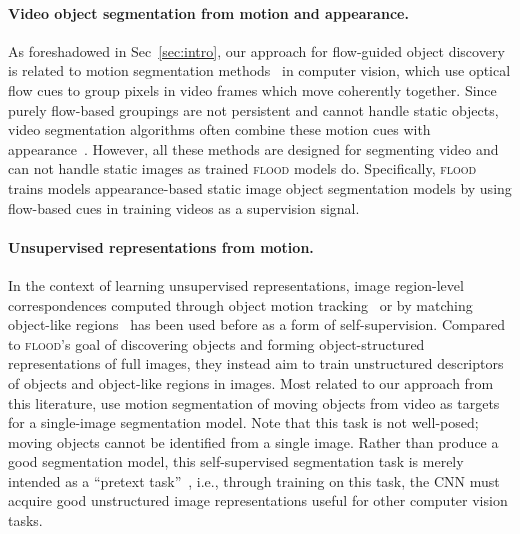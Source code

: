 \documentclass{article}
\begin{document}
\paragraph{Video object segmentation from motion and appearance.} As foreshadowed in Sec~\ref{sec:intro}, our approach for flow-guided object discovery is related to motion segmentation methods~\cite{shi1998motion,tron2007benchmark,yan2006general,tokmakov2017learning,keuper2018motion,bideau2018moa, yang2021rigidmask} in computer vision, which use optical flow cues to group pixels in video frames which move coherently together. Since purely flow-based groupings are not persistent and cannot handle static objects, video segmentation algorithms often combine these motion cues with appearance~\cite{weiss1995perceptually, jain2017fusionseg, tokmakov2017learning, cheng2017segflow}. However, all these methods are designed for segmenting video and can not handle static images as trained \textsc{flood} models do. Specifically, \textsc{flood} trains models appearance-based static image object segmentation models by using flow-based cues in training videos as a supervision signal.


\paragraph{Unsupervised representations from motion.} In the context of learning unsupervised representations, image region-level correspondences computed through object motion tracking~\cite{wang2015unsupervised} or by matching object-like regions~\cite{gao2016object} has been used before as a form of self-supervision. Compared to \textsc{flood}'s goal of discovering objects and forming object-structured representations of full images, they instead aim to train unstructured descriptors of objects and object-like regions in images. Most related to our approach from this literature, \citet{pathak2017learning} use motion segmentation of moving objects from video as targets for a single-image segmentation model. Note that this task is not well-posed; moving objects cannot be identified from a single image. Rather than produce a good segmentation model, this self-supervised segmentation task is merely intended as a ``pretext task''~\cite{pathak2017learning}, i.e., through training on this task, the CNN must acquire good unstructured image representations useful for other computer vision tasks.
\end{document}
